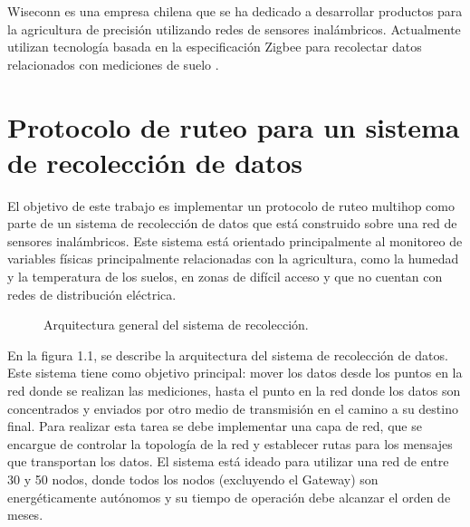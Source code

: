 Wiseconn es una empresa chilena que se ha dedicado a desarrollar productos para la agricultura de precisión utilizando redes de sensores inalámbricos. Actualmente utilizan tecnología basada en la especificación Zigbee para recolectar datos relacionados con mediciones de suelo \cite{Wiseconn}.


\section{Protocolo de ruteo para un sistema de recolección de datos}

El objetivo de este trabajo es implementar un protocolo de ruteo multihop como parte de un sistema de recolección de datos que está construido sobre una red de sensores inalámbricos. Este sistema está orientado principalmente al monitoreo de variables físicas principalmente relacionadas con la agricultura, como la humedad y la temperatura de los suelos, en zonas de difícil acceso y que no cuentan con redes de distribución eléctrica.

\begin{figure}[H]
\caption{Arquitectura general del sistema de recolección.}
\end{figure}

En la figura 1.1, se describe la arquitectura del sistema de recolección de datos. Este sistema tiene como objetivo principal: mover los datos desde los puntos en la red donde se realizan las mediciones, hasta el punto en la red donde los datos son concentrados y enviados por otro medio de transmisión en el camino a su destino final. Para realizar esta tarea se debe implementar una capa de red, que se encargue de controlar la topología de la red y establecer rutas para los mensajes que transportan los datos. El sistema está ideado para utilizar una red de entre 30 y 50 nodos, donde todos los nodos (excluyendo el Gateway) son energéticamente autónomos y su tiempo de operación debe alcanzar el orden de meses.

